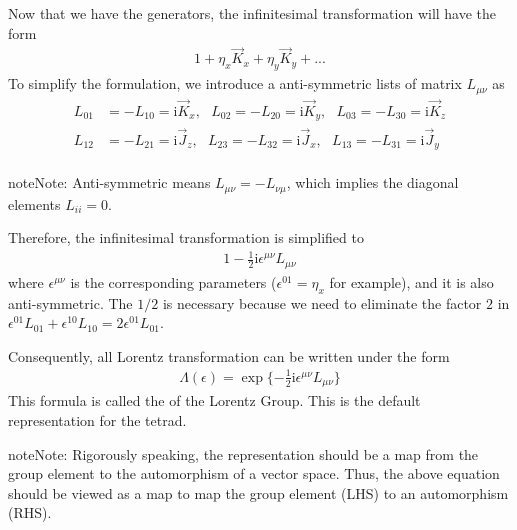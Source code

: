 \documentclass[letterpaper,10pt,english]{sphinxmanual}
\begin{document}
Now that we have the generators, the infinitesimal transformation will have the form
\begin{equation*}
\begin{split}1 + \eta_x\vec K_x + \eta_y \vec K_y + ...\end{split}
\end{equation*}
To simplify the formulation, we introduce a anti-symmetric lists of matrix \(L_{\mu\nu}\) as
\begin{equation*}
\begin{split}L_{01} &= -L_{10} = \mathrm{i}\vec K_x,\ \ \ L_{02} = -L_{20} = \mathrm{i}\vec K_y,\ \ \ L_{03} = -L_{30} = \mathrm{i}\vec K_z\\
L_{12} &= -L_{21} = \mathrm{i}\vec J_z,\ \ \ L_{23} = -L_{32} = \mathrm{i}\vec J_x,\ \ \ L_{13} = -L_{31} = \mathrm{i}\vec J_y\\\end{split}
\end{equation*}
\begin{sphinxadmonition}{note}{Note:}
Anti-symmetric means \(L_{\mu\nu} = -L_{\nu\mu}\), which implies the diagonal elements \(L_{ii} = 0\).
\end{sphinxadmonition}

Therefore, the infinitesimal transformation is simplified to
\begin{equation*}
\begin{split}1 - \frac{1}{2}\mathrm{i}\epsilon^{\mu\nu}L_{\mu\nu}\end{split}
\end{equation*}
where \(\epsilon^{\mu\nu}\) is the corresponding parameters (\(\epsilon^{01} = \eta_x\) for example), and it is also anti-symmetric. The \(1/2\) is necessary because we need to eliminate the factor \(2\) in \(\epsilon^{01}L_{01} + \epsilon^{10}L_{10} = 2\epsilon^{01}L_{01}\).

Consequently, all Lorentz transformation can be written under the form
\begin{equation*}
\begin{split}\varLambda(\epsilon) = \exp\{-\frac{1}{2}\mathrm{i}\epsilon^{\mu\nu}L_{\mu\nu}\}\end{split}
\end{equation*}
This formula is called the  of the Lorentz Group. This is the default representation for the tetrad.

\begin{sphinxadmonition}{note}{Note:}
Rigorously speaking, the representation should be a map from the group element to the automorphism of a vector space. Thus, the above equation should be viewed as a map to map the group element (LHS) to an automorphism (RHS).
\end{sphinxadmonition}
\end{document}
